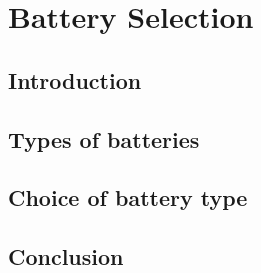 \chapter{Battery Selection}
\section{Introduction}
\section{Types of batteries}
\section{Choice of battery type}
\section{Conclusion}